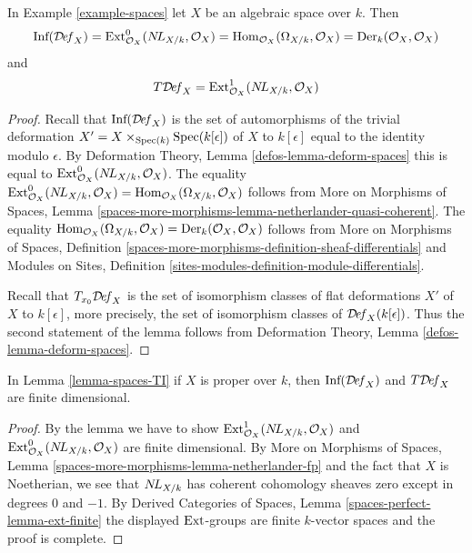\begin{lemma}
\label{lemma-spaces-TI}
In Example \ref{example-spaces} let $X$ be an algebraic space over $k$. Then
$$
\text{Inf}(\mathcal{D}\!\mathit{ef}_X) =
\text{Ext}^0_{\mathcal{O}_X}(\mathop{N\!L}\nolimits_{X/k}, \mathcal{O}_X) =
\mathop{\mathrm{Hom}}\nolimits_{\mathcal{O}_X}(\Omega_{X/k}, \mathcal{O}_X) =
\text{Der}_k(\mathcal{O}_X, \mathcal{O}_X)
$$
and
$$
T\mathcal{D}\!\mathit{ef}_X =
\text{Ext}^1_{\mathcal{O}_X}(\mathop{N\!L}\nolimits_{X/k}, \mathcal{O}_X)
$$
\end{lemma}

\begin{proof}
Recall that $\text{Inf}(\mathcal{D}\!\mathit{ef}_X)$ is the set of
automorphisms of the trivial deformation
$X' = X \times_{\mathop{\mathrm{Spec}}(k)} \mathop{\mathrm{Spec}}(k[\epsilon])$ of $X$ to $k[\epsilon]$
equal to the identity modulo $\epsilon$.
By Deformation Theory, Lemma \ref{defos-lemma-deform-spaces}
this is equal to $\text{Ext}^0_{\mathcal{O}_X}(\mathop{N\!L}\nolimits_{X/k}, \mathcal{O}_X)$.
The equality $\text{Ext}^0_{\mathcal{O}_X}(\mathop{N\!L}\nolimits_{X/k}, \mathcal{O}_X) =
\mathop{\mathrm{Hom}}\nolimits_{\mathcal{O}_X}(\Omega_{X/k}, \mathcal{O}_X)$ follows from
More on Morphisms of Spaces, Lemma
\ref{spaces-more-morphisms-lemma-netherlander-quasi-coherent}.
The equality
$\mathop{\mathrm{Hom}}\nolimits_{\mathcal{O}_X}(\Omega_{X/k}, \mathcal{O}_X) =
\text{Der}_k(\mathcal{O}_X, \mathcal{O}_X)$
follows from More on Morphisms of Spaces, Definition
\ref{spaces-more-morphisms-definition-sheaf-differentials} and
Modules on Sites, Definition
\ref{sites-modules-definition-module-differentials}.

\medskip\noindent
Recall that $T_{x_0}\mathcal{D}\!\mathit{ef}_X$ is the set of isomorphism classes
of flat deformations $X'$ of $X$ to $k[\epsilon]$, more precisely,
the set of isomorphism classes of $\mathcal{D}\!\mathit{ef}_X(k[\epsilon])$.
Thus the second statement of the lemma follows from
Deformation Theory, Lemma \ref{defos-lemma-deform-spaces}.
\end{proof}

\begin{lemma}
\label{lemma-proper-spaces-TI}
In Lemma \ref{lemma-spaces-TI} if $X$ is proper over $k$, then
$\text{Inf}(\mathcal{D}\!\mathit{ef}_X)$ and $T\mathcal{D}\!\mathit{ef}_X$ are
finite dimensional.
\end{lemma}

\begin{proof}
By the lemma we have to show
$\mathop{\mathrm{Ext}}\nolimits^1_{\mathcal{O}_X}(\mathop{N\!L}\nolimits_{X/k}, \mathcal{O}_X)$ and
$\mathop{\mathrm{Ext}}\nolimits^0_{\mathcal{O}_X}(\mathop{N\!L}\nolimits_{X/k}, \mathcal{O}_X)$ are finite
dimensional. By More on Morphisms of Spaces, Lemma
\ref{spaces-more-morphisms-lemma-netherlander-fp}
and the fact that $X$ is Noetherian, we see that
$\mathop{N\!L}\nolimits_{X/k}$ has coherent cohomology sheaves zero except
in degrees $0$ and $-1$.
By Derived Categories of Spaces, Lemma \ref{spaces-perfect-lemma-ext-finite}
the displayed $\mathop{\mathrm{Ext}}\nolimits$-groups are finite $k$-vector spaces
and the proof is complete.
\end{proof}

